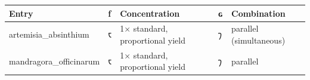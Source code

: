\begin{longtable}[]{@{}lllll@{}}
\toprule
\begin{minipage}[b]{0.17\columnwidth}\raggedright
Entry\strut
\end{minipage} & \begin{minipage}[b]{0.17\columnwidth}\raggedright
ƒ\strut
\end{minipage} & \begin{minipage}[b]{0.17\columnwidth}\raggedright
Concentration\strut
\end{minipage} & \begin{minipage}[b]{0.17\columnwidth}\raggedright
ɢ\strut
\end{minipage} & \begin{minipage}[b]{0.17\columnwidth}\raggedright
Combination\strut
\end{minipage}\tabularnewline
\midrule
\endhead
\begin{minipage}[t]{0.17\columnwidth}\raggedright
artemisia\_absinthium\strut
\end{minipage} & \begin{minipage}[t]{0.17\columnwidth}\raggedright
𐑱\strut
\end{minipage} & \begin{minipage}[t]{0.17\columnwidth}\raggedright
1× standard, proportional yield\strut
\end{minipage} & \begin{minipage}[t]{0.17\columnwidth}\raggedright
𐑠\strut
\end{minipage} & \begin{minipage}[t]{0.17\columnwidth}\raggedright
parallel (simultaneous)\strut
\end{minipage}\tabularnewline
\begin{minipage}[t]{0.17\columnwidth}\raggedright
mandragora\_officinarum\strut
\end{minipage} & \begin{minipage}[t]{0.17\columnwidth}\raggedright
𐑱\strut
\end{minipage} & \begin{minipage}[t]{0.17\columnwidth}\raggedright
1× standard, proportional yield\strut
\end{minipage} & \begin{minipage}[t]{0.17\columnwidth}\raggedright
𐑠\strut
\end{minipage} & \begin{minipage}[t]{0.17\columnwidth}\raggedright
parallel\strut
\end{minipage}\tabularnewline

\end{longtable}
